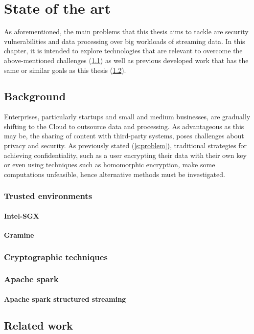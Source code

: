 \chapter{State of the art}\label{c:sota}
As aforementioned, the main problems that this thesis aims to tackle are security vulnerabilities and data processing over big workloads of streaming data. In this chapter, it is intended to explore technologies that are relevant to overcome the above-mentioned challenges (\ref{s:back}) as well as previous developed work that has the same or similar goals as this thesis (\ref{s:relWork}).
\section{Background}\label{s:back}
Enterprises, particularly startups and small and medium businesses, are gradually shifting to the Cloud to outsource data and processing. \cite{6227695} As advantageous as this may be, the sharing of content with third-party systems, poses challenges about privacy and security. As previously stated (\ref{s:problem}), traditional strategies for achieving confidentiality, such as a user encrypting their data with their own key or even using techniques such as homomorphic encryption, make some computations unfeasible, hence alternative methods must be investigated.


\subsection{Trusted environments}
\subsubsection{Intel-SGX}
\subsubsection{Gramine}

\subsection{Cryptographic techniques}

\subsection{Apache spark}
\subsubsection{Apache spark structured streaming}


\section{Related work}\label{s:relWork}
